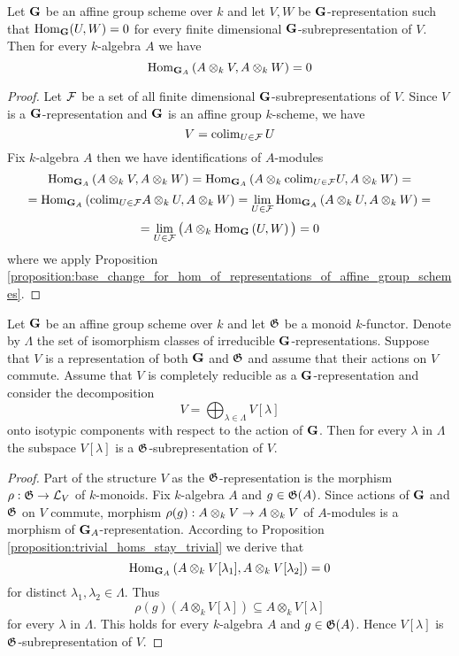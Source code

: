 \begin{proposition}\label{proposition:trivial_homs_stay_trivial}
Let $\mathbf{G}$ be an affine group scheme over $k$ and let $V, W$ be $\mathbf{G}$-representation such that $\mathrm{Hom}_{\mathbf{G}}(U,W) = 0$ for every finite dimensional $\mathbf{G}$-subrepresentation of $V$. Then for every $k$-algebra $A$ we have
$$\mathrm{Hom}_{\mathbf{G}_A}\left(A\otimes_kV,A\otimes_kW\right)=0$$
\end{proposition}
\begin{proof}
Let ${\mathcal F}$ be a set of all finite dimensional $\mathbf{G}$-subrepresentations of $V$. Since $V$ is a $\mathbf{G}$-representation and $\mathbf{G}$ is an affine group $k$-scheme, we have
$$V= \mathrm{colim}_{U\in {\mathcal F}}\,U$$
Fix $k$-algebra $A$ then we have identifications of $A$-modules
$$\mathrm{Hom}_{\mathbf{G}_A}\left(A\otimes_kV,A\otimes_kW\right) = \mathrm{Hom}_{\mathbf{G}_A}\left(A\otimes_k\mathrm{colim}_{U\in {\mathcal F}}U,A\otimes_kW\right) =$$
$$ = \mathrm{Hom}_{\mathbf{G}_A}\left(\mathrm{colim}_{U\in {\mathcal F}}A \otimes_k U,A \otimes_k W\right) = \lim_{U\in {\mathcal F}} \mathrm{Hom}_{\mathbf{G}_A}\left(A \otimes_k U,A \otimes_k W\right) = $$
$$ = \lim_{U\in {\mathcal F}} \big(A\otimes_k\mathrm{Hom}_{\mathbf{G}}\left(U,W\right)\big) = 0$$
where we apply Proposition \ref{proposition:base_change_for_hom_of_representations_of_affine_group_schemes}.
\end{proof}

\begin{corollary}\label{corollary:commuting_action_preserves_isotypic_decomposition}
Let $\mathbf{G}$ be an affine group scheme over $k$ and let ${\mathfrak G}$ be a monoid $k$-functor. Denote by $\Lambda$ the set of isomorphism classes of irreducible $\mathbf{G}$-representations. Suppose that $V$ is a representation of both $\mathbf{G}$ and ${\mathfrak G}$ and assume that their actions on $V$ commute. Assume that $V$ is completely reducible as a $\mathbf{G}$-representation and consider the decomposition
$$V = \bigoplus_{\lambda\in \Lambda}V[\lambda]$$
onto isotypic components with respect to the action of $\mathbf{G}$. Then for every $\lambda$ in $\Lambda$ the subspace $V[\lambda]$ is a ${\mathfrak G}$-subrepresentation of $V$.
\end{corollary}
\begin{proof}
Part of the structure $V$ as the ${\mathfrak G}$-representation is the morphism $\rho:{\mathfrak G} \rightarrow {\mathcal L}_V$ of $k$-monoids. Fix $k$-algebra $A$ and $g\in {\mathfrak G}(A)$. Since actions of $\mathbf{G}$ and ${\mathfrak G}$ on $V$ commute, morphism $\rho(g):A\otimes_kV\rightarrow A\otimes_kV$ of $A$-modules is a morphism of $\mathbf{G}_A$-representation. According to Proposition \ref{proposition:trivial_homs_stay_trivial} we derive that
$$\mathrm{Hom}_{\mathbf{G}_A}\left(A\otimes_kV[\lambda_1],A\otimes_kV[\lambda_2]\right) = 0$$
for distinct $\lambda_1,\lambda_2\in \Lambda$. Thus
$$\rho(g)\left(A \otimes_k V[\lambda] \right)\subseteq A \otimes_kV[\lambda]$$
for every $\lambda$ in $\Lambda$. This holds for every $k$-algebra $A$ and $g\in {\mathfrak G}(A)$. Hence $V[\lambda]$ is ${\mathfrak G}$-subrepresentation of $V$.
\end{proof}

